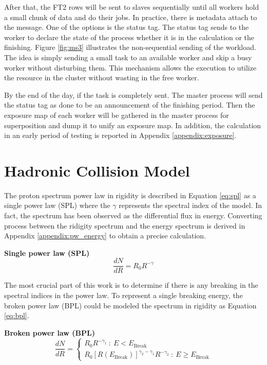 After that, the FT2 rows will be sent to slaves sequentially until
all workers hold a small chunk of data and do their jobs.
In practice, there is metadata attach to the message. 
One of the options is the status tag. The status tag sends to the 
worker to declare the state of the process whether it is in the 
calculation or the finishing. Figure \ref{fig:ms3} illustrates 
the non-sequential sending of the workload. The idea is simply sending a small task to an available worker and skip a busy worker
without disturbing them. This mechanism allows the execution to utilize 
the resource in the cluster without wasting in the free worker.


By the end of the day, if the task is completely sent.
The master process will send the status tag as done to be an 
announcement of the finishing period. Then the exposure map of 
each worker will be gathered in the master process for superposition
and dump it to unify an exposure map. In addition, the calculation 
in an early period of testing is reported in Appendix \ref{appendix:exposure}.


\section{Hadronic Collision Model}
The proton spectrum power law in rigidity is described in Equation \ref{eq:spl}
as a single power law (SPL)
where the $\gamma$ represents the spectral index of the model. 
In fact, the spectrum has been observed as the differential flux 
in energy. Converting process between the ridigity spectrum and the 
energy spectrum is derived in Appendix \ref{appendix:pw_energy} to 
obtain a precise calculation.


\textbf{Single power law (SPL)}
\begin{equation}
    \frac{dN}{dR} = R_0R^{-\gamma}
    \label{eq:spl}
\end{equation}

The most crucial part of this work is to determine if there is any 
breaking in the spectral indices in the power law. To represent 
a single breaking energy, the broken power law (BPL) could be modeled 
the spectrum in rigidity as Equation \ref{eq:bpl}.


\textbf{Broken power law (BPL)}
\begin{equation}
\frac{dN}{dR}=
  \begin{cases}
    R_0R^{-\gamma_1}\ :\ E < E_{\text{Break}}\\
    R_0[R(E_{\text{Break}})]^{\gamma_2-\gamma_1}R^{-\gamma_2}\ :\ E \ge E_{\text{Break}}
  \end{cases}
  \label{eq:bpl}
\end{equation}

